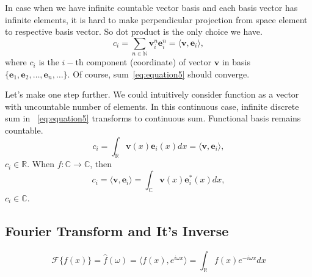     In case when we have infinite countable vector basis and each basis vector has infinite elements, it is hard to make perpendicular
    projection from space element to respective basis vector.
    So dot product is the only choice we have.
    \begin{equation}\label{eq:equation5}
        c_i = \sum_{n \in \mathbb N} \mathbf{v}^n_i \mathbf{e}^n_i = \langle \mathbf{v}, \mathbf{e}_i \rangle,
    \end{equation}
    where $c_i$ is the $i-$th component (coordinate) of vector $\mathbf{v}$ in basis
    $\{ \mathbf{e}_1, \mathbf{e}_2, \dots, \mathbf{e}_n, \dots \}$.
    Of course, sum~\eqref{eq:equation5} should converge.

    Let's make one step further.
    We could intuitively consider function as a vector with uncountable number of elements.
    In this continuous case, infinite discrete sum in ~\eqref{eq:equation5} transforms to continuous sum.
    Functional basis remains countable.
    \begin{equation}\label{eq:equation6}
        c_i = \int_{\mathbb R} \mathbf{v}(x) \mathbf{e}_i(x)  dx = \langle \mathbf{v}, \mathbf{e}_i \rangle,
    \end{equation}
    $c_i \in \mathbb R$.
    When $f: \mathbb{C} \to \mathbb{C}$, then
    \begin{equation}\label{eq:equation7}
        c_i = \langle \mathbf{v}, \mathbf{e}_i \rangle = \int_{\mathbb C} \mathbf{v}(x) \mathbf{e}^{\ast}_i(x) dx,
    \end{equation}
    $c_i \in \mathbb C$.

    \subsection{Fourier Transform and It's Inverse}\label{sec:fourier-transform}

        \[
            \mathcal F \{ f(x) \}  = \hat f (\omega) = \langle f(x), e^{i \omega x} \rangle =
            \int_{\mathbb R} f(x) e^{-i \omega x} dx
        \]

